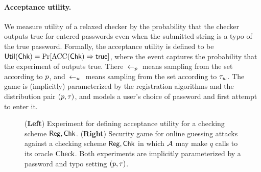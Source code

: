 \paragraph{Acceptance utility.} We measure utility of a relaxed checker by the
probability that the checker outputs true for entered passwords even when the
submitted string is a typo of the true password.
Formally, the acceptance utility is defined 
to be $\textnormal{\textsf{Util}}(\textnormal{\textsf{Chk}}) = \Pr[\textnormal{ACC}(\textnormal{\textsf{Chk}})\Rightarrow \textsf{true}]$, where the
event captures the probability that the experiment of 
outputs true.  %
There ${\:\leftarrow_{p}\:}$ means sampling from the set according
to $p$, and ${\:\leftarrow_{{w}}\:}$ means sampling from the set according to
$\tau_{w}$.  The game is (implicitly) parameterized by the registration
algorithms and the distribution pair $(p,\tau)$, and models a user's
choice of password and first attempt to enter it. 

\begin{figure}[t]
\center
{}
\caption{(\textbf{Left}) Experiment for defining acceptance utility
  for a checking scheme $\textnormal{\textsf{Reg}},\textnormal{\textsf{Chk}}$.
  (\textbf{Right}) Security game for online guessing attacks against a checking
  scheme $\textnormal{\textsf{Reg}},\textnormal{\textsf{Chk}}$ in which $\advA$ may make $q$ calls to its oracle $\textnormal{Check}$. Both
  experiments are implicitly parameterized by a password and typo setting
  $(p,\tau)$.}
\label{fig:acc-security}
\end{figure}

